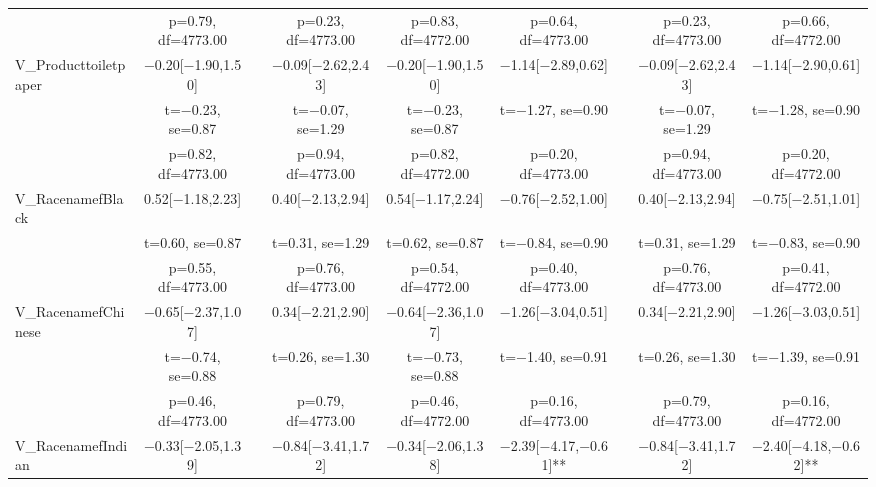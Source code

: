 \documentclass[]{report}
\begin{document}
\begin{table}
{\begin{tabular}[t]{lcccccccc}
		& p=\num{0.79}, df=\num{4773.00} &  & p=\num{0.23}, df=\num{4773.00} & p=\num{0.83}, df=\num{4772.00} & p=\num{0.64}, df=\num{4773.00} &  & p=\num{0.23}, df=\num{4773.00} & p=\num{0.66}, df=\num{4772.00}\\
		V\_Producttoiletpaper & \num{-0.20}[\num{-1.90},\num{1.50}] &  & \num{-0.09}[\num{-2.62},\num{2.43}] & \num{-0.20}[\num{-1.90},\num{1.50}] & \num{-1.14}[\num{-2.89},\num{0.62}] &  & \num{-0.09}[\num{-2.62},\num{2.43}] & \num{-1.14}[\num{-2.90},\num{0.61}]\\
		& t=\num{-0.23}, se=\num{0.87} &  & t=\num{-0.07}, se=\num{1.29} & t=\num{-0.23}, se=\num{0.87} & t=\num{-1.27}, se=\num{0.90} &  & t=\num{-0.07}, se=\num{1.29} & t=\num{-1.28}, se=\num{0.90}\\
		& p=\num{0.82}, df=\num{4773.00} &  & p=\num{0.94}, df=\num{4773.00} & p=\num{0.82}, df=\num{4772.00} & p=\num{0.20}, df=\num{4773.00} &  & p=\num{0.94}, df=\num{4773.00} & p=\num{0.20}, df=\num{4772.00}\\
		V\_RacenamefBlack & \num{0.52}[\num{-1.18},\num{2.23}] &  & \num{0.40}[\num{-2.13},\num{2.94}] & \num{0.54}[\num{-1.17},\num{2.24}] & \num{-0.76}[\num{-2.52},\num{1.00}] &  & \num{0.40}[\num{-2.13},\num{2.94}] & \num{-0.75}[\num{-2.51},\num{1.01}]\\
		& t=\num{0.60}, se=\num{0.87} &  & t=\num{0.31}, se=\num{1.29} & t=\num{0.62}, se=\num{0.87} & t=\num{-0.84}, se=\num{0.90} &  & t=\num{0.31}, se=\num{1.29} & t=\num{-0.83}, se=\num{0.90}\\
		& p=\num{0.55}, df=\num{4773.00} &  & p=\num{0.76}, df=\num{4773.00} & p=\num{0.54}, df=\num{4772.00} & p=\num{0.40}, df=\num{4773.00} &  & p=\num{0.76}, df=\num{4773.00} & p=\num{0.41}, df=\num{4772.00}\\
		V\_RacenamefChinese & \num{-0.65}[\num{-2.37},\num{1.07}] &  & \num{0.34}[\num{-2.21},\num{2.90}] & \num{-0.64}[\num{-2.36},\num{1.07}] & \num{-1.26}[\num{-3.04},\num{0.51}] &  & \num{0.34}[\num{-2.21},\num{2.90}] & \num{-1.26}[\num{-3.03},\num{0.51}]\\
		& t=\num{-0.74}, se=\num{0.88} &  & t=\num{0.26}, se=\num{1.30} & t=\num{-0.73}, se=\num{0.88} & t=\num{-1.40}, se=\num{0.91} &  & t=\num{0.26}, se=\num{1.30} & t=\num{-1.39}, se=\num{0.91}\\
		& p=\num{0.46}, df=\num{4773.00} &  & p=\num{0.79}, df=\num{4773.00} & p=\num{0.46}, df=\num{4772.00} & p=\num{0.16}, df=\num{4773.00} &  & p=\num{0.79}, df=\num{4773.00} & p=\num{0.16}, df=\num{4772.00}\\
		V\_RacenamefIndian & \num{-0.33}[\num{-2.05},\num{1.39}] &  & \num{-0.84}[\num{-3.41},\num{1.72}] & \num{-0.34}[\num{-2.06},\num{1.38}] & \num{-2.39}[\num{-4.17},\num{-0.61}]** &  & \num{-0.84}[\num{-3.41},\num{1.72}] & \num{-2.40}[\num{-4.18},\num{-0.62}]**\\

\end{tabular}}
\end{table}
\end{document}
